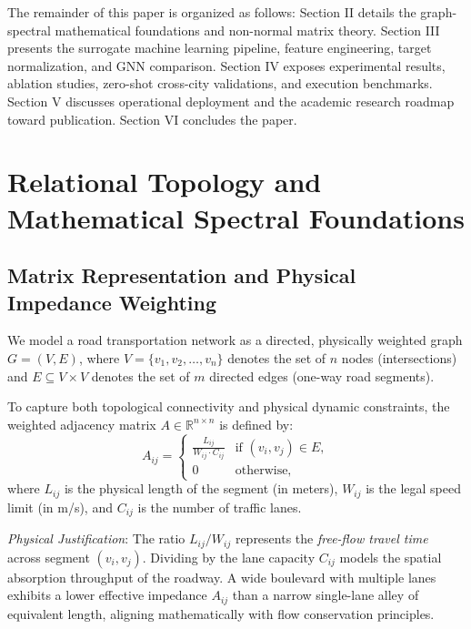 \documentclass[lettersize,journal]{IEEEtran}
\begin{document}
The remainder of this paper is organized as follows: Section II details the graph-spectral mathematical foundations and non-normal matrix theory. Section III presents the surrogate machine learning pipeline, feature engineering, target normalization, and GNN comparison. Section IV exposes experimental results, ablation studies, zero-shot cross-city validations, and execution benchmarks. Section V discusses operational deployment and the academic research roadmap toward publication. Section VI concludes the paper.

\section{Relational Topology and Mathematical Spectral Foundations}

\subsection{Matrix Representation and Physical Impedance Weighting}
We model a road transportation network as a directed, physically weighted graph $G = (V, E)$, where $V = \{v_1, v_2, \dots, v_n\}$ denotes the set of $n$ nodes (intersections) and $E \subseteq V \times V$ denotes the set of $m$ directed edges (one-way road segments).

To capture both topological connectivity and physical dynamic constraints, the weighted adjacency matrix $A \in \mathbb{R}^{n \times n}$ is defined by:
\begin{equation}
A_{ij} = \begin{cases} 
\frac{L_{ij}}{W_{ij} \cdot C_{ij}} & \text{if } (v_i, v_j) \in E, \\ 
0 & \text{otherwise,} 
\end{cases}
\label{eq:adjacency}
\end{equation}
where $L_{ij}$ is the physical length of the segment (in meters), $W_{ij}$ is the legal speed limit (in m/s), and $C_{ij}$ is the number of traffic lanes.

\textit{Physical Justification}: The ratio $L_{ij}/W_{ij}$ represents the \emph{free-flow travel time} across segment $(v_i, v_j)$. Dividing by the lane capacity $C_{ij}$ models the spatial absorption throughput of the roadway. A wide boulevard with multiple lanes exhibits a lower effective impedance $A_{ij}$ than a narrow single-lane alley of equivalent length, aligning mathematically with flow conservation principles.
\end{document}
